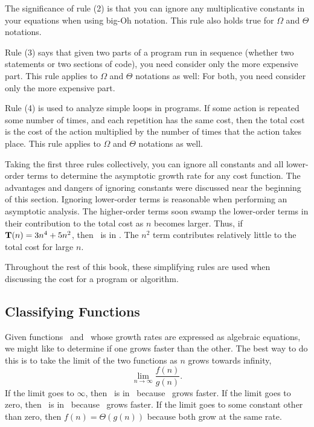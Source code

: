 The significance of rule (2) is that you can ignore any multiplicative
constants in your equations when using big-Oh notation.
This rule also holds true for \(\Omega\) and \(\Theta\) notations.

Rule (3) says that given two parts of a program run in sequence
(whether two statements or two sections of code),
you need consider only the more expensive part.
This rule applies to \(\Omega\) and \(\Theta\) notations as well:
For both, you need consider only the more expensive part.

Rule (4) is used to analyze simple loops in programs.
If some action is repeated some number of times,
and each repetition has the same cost, then the total cost
is the cost of the action multiplied by the number of times that the
action takes place.
This rule applies to \(\Omega\) and \(\Theta\) notations as well.

Taking the first three rules collectively, you can ignore all
constants and all lower-order terms to determine the asymptotic growth
rate for any cost function.
The advantages and dangers of ignoring constants were discussed near
the beginning of this section.
Ignoring lower-order terms is reasonable when performing an
asymptotic analysis.
The higher-order terms soon swamp the lower-order terms in their
contribution to the total cost as \(n\) becomes larger.
Thus, if \(\mbox{$\textbf{T}(n)$} = 3 n^4 + 5 n^2\), then \Tn\ is in \Onfour.
The \(n^2\) term contributes relatively little to the total cost for
large \(n\).

Throughout the rest of this book, these simplifying
rules are used when discussing the cost for a program or algorithm.

\subsection{Classifying Functions}
\label{ClassifyFuncs}

Given functions \fn\ and \gn\ whose growth rates are expressed as
algebraic equations, we might like to determine if one grows faster
than the other.
The best way to do this is to take the limit of the two
functions as \(n\) grows towards infinity,
\[\lim_{n \rightarrow \infty} \frac{f(n)}{g(n)}.\]
If the limit goes to \(\infty\), then \fn\ is in \Omegagn\ because
\fn\ grows faster.
If the limit goes to zero, then \fn\ is in \Ogn\ because \gn\ grows
faster.
If the limit goes to some constant other than zero, then
\(f(n) = \Theta(g(n))\) because both grow at the same rate.

